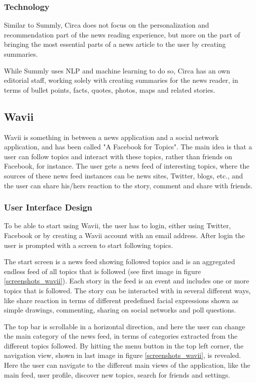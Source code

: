 \subsubsection{Technology}
Similar to Summly, Circa does not focus on the personalization and recommendation part of the news reading experience, but more on the part of bringing the most essential parts of a news article to the user by creating summaries.

While Summly uses NLP and machine learning to do so, Circa has an own editorial staff, working solely with creating summaries for the news reader, in terms of bullet points, facts, quotes, photos, maps and related stories\cite{circa_about}.

\subsection{Wavii}
Wavii is something in between a news application and a social network application, and has been called "A Facebook for Topics"\cite{wavii_facebook_for_topics}. The main idea is that a user can follow topics and interact with these topics, rather than friends on Facebook, for instance. The user gets a news feed of interesting topics, where the sources of these news feed instances can be news sites, Twitter, blogs, etc., and the user can share his/hers reaction to the story, comment and share with friends.	

\subsubsection{User Interface Design}
To be able to start using Wavii, the user has to login, either using Twitter, Facebook or by creating a Wavii account with an email address. After login the user is prompted with a screen to start following topics.

The start screen is a news feed showing followed topics and is an aggregated endless feed of all topics that is followed (see first image in figure \ref{screenshots_wavii}). Each story in the feed is an event and includes one or more topics that is followed. The story can be interacted with in several different ways, like share reaction in terms of different predefined facial expressions shown as simple drawings, commenting, sharing on social networks and poll questions.

The top bar is scrollable in a horizontal direction, and here the user can change the main category of the news feed, in terms of categories extracted from the different topics followed. By hitting the menu button in the top left corner, the navigation view, shown in last image in figure \ref{screenshots_wavii}, is revealed. Here the user can navigate to the different main views of the application, like the main feed, user profile, discover new topics, search for friends and settings.

